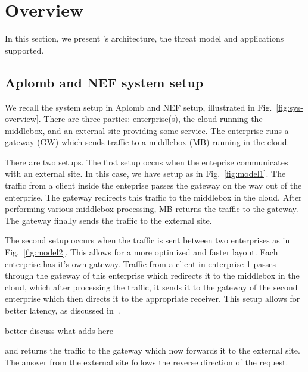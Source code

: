 
\section{Overview}\label{sec:overview}

In this section, we present \sys's architecture, the threat model and applications supported.

\subsection{Aplomb and NEF system setup}

We recall the system setup in Aplomb and NEF setup, illustrated in Fig.~\ref{fig:sys-overview}. 
There are three parties: enterprise(s), the cloud running the middlebox, and an external site providing
some service. 
The enterprise runs a gateway (GW) which sends traffic to a middlebox (MB) running in the cloud.

There are two setups. The first setup occus when the enteprise communicates with an external site.  In this case, we have setup as in Fig.~\ref{fig:model1}.
The traffic from a client inside the enteprise passes the gateway on the way out of the enterprise. The gateway redirects this traffic to the middlebox in the cloud.
After performing various middlebox processing, MB returns the traffic to the gateway. The gateway finally sends the traffic to the external site. 


The second setup occurs when the traffic is sent between two enterprises as in Fig.~\ref{fig:model2}. This allows for a more optimized and faster layout. Each enterprise has it's own gateway.
Traffic from a client in enterprise 1 passes through the gateway of this enterprise which redirects it to the middlebox in the cloud, which after processing the traffic, it sends it to the gateway of the second enterprise which then directs it to the appropriate receiver. This setup allows for better latency, as discussed in~\cite{aplomb}.




better discuss what \sys adds here 

and returns the traffic
to the gateway which now forwards it to the external site. The answer from the external site follows the reverse direction of the
request.



